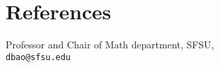 \section{\sc   References}

\begin{list1}
\item[\bf Dr. David Bao] Professor and Chair of Math department, SFSU, \\
 \texttt{dbao@sfsu.edu}

\end{list1}